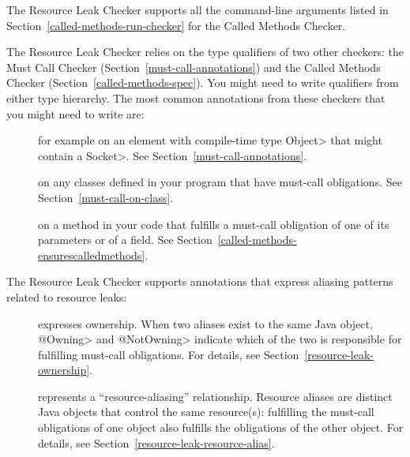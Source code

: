 The Resource Leak Checker supports all the command-line arguments
 listed in Section~\ref{called-methods-run-checker} for
the Called Methods Checker.


The Resource Leak Checker relies on the type qualifiers of two other checkers:
the Must Call Checker (Section~\ref{must-call-annotations}) and
the Called Methods Checker (Section~\ref{called-methods-spec}). You might need
to write qualifiers from either type hierarchy. The most common annotations from
these checkers that you might need to write are:

\begin{description}

\item[]
for example on an element with compile-time type \<Object> that might contain a \<Socket>.
See Section~\ref{must-call-annotations}.

\item[]
on any classes defined in your program that have must-call obligations. See Section~\ref{must-call-on-class}.

\item[] on a method in
your code that fulfills a must-call obligation of one of its parameters or of a field.
See Section~\ref{called-methods-ensurescalledmethods}.

\end{description}

The Resource Leak Checker supports annotations that express
aliasing patterns related to resource leaks:

\begin{description}

\item[]
\item[]
  expresses ownership.  When two aliases exist to the same Java object,
  \<@Owning> and \<@NotOwning> indicate which of the two is responsible for
  fulfilling must-call obligations.  For details, see
  Section~\ref{resource-leak-ownership}.

\item[]
  represents a ``resource-aliasing'' relationship.  Resource aliases are
  distinct Java objects that control the same resource(s):
  fulfilling the must-call obligations of one object also
  fulfills the obligations of the other object.  For details,
  see Section~\ref{resource-leak-resource-alias}.

\end{description}

